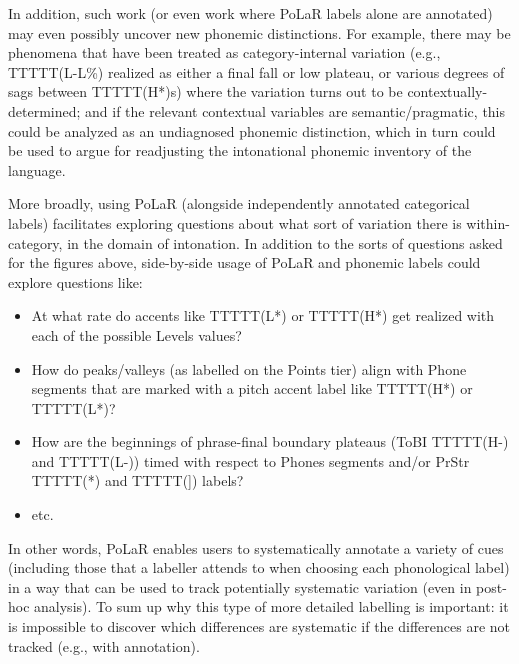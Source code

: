 \documentclass[11pt, twoside]{memoir}
\begin{document}
In addition, such work (or even work where PoLaR labels alone are annotated) may even possibly uncover new phonemic distinctions. For example, there may be phenomena that have been treated as category-internal variation (e.g., TTTTT(L-L\%) realized as either a final fall or low plateau, or various degrees of sags between TTTTT(H*)s) where the variation turns out to be contextually-determined; and if the relevant contextual variables are semantic\slash pragmatic, this could be analyzed as an undiagnosed phonemic distinction, which in turn could be used to argue for readjusting the intonational phonemic inventory of the language.

More broadly, using PoLaR (alongside independently annotated categorical labels) facilitates exploring questions about what sort of variation there is within-category, in the domain of intonation. In addition to the sorts of questions asked for the figures above, side-by-side usage of PoLaR and phonemic labels could explore questions like:

\begin{itemize}
	\item At what rate do accents like TTTTT(L*) or TTTTT(H*) get realized with each of the possible Levels values?
	\item How do peaks\slash valleys (as labelled on the Points tier) align with Phone segments that are marked with a pitch accent label like TTTTT(H*) or TTTTT(L*)?
	\item How are the beginnings of phrase-final boundary plateaus (ToBI TTTTT(H-) and TTTTT(L-)) timed with respect to Phones segments and/or PrStr TTTTT(*) and TTTTT(]) labels?
	\item etc.
\end{itemize}

In other words, PoLaR enables users to systematically annotate a variety of cues (including those that a labeller attends to when choosing each phonological label) in a way that can be used to track potentially systematic variation (even in post-hoc analysis). To sum up why this type of more detailed labelling is important: it is impossible to discover which differences are systematic if the differences are not tracked (e.g., with annotation).
\end{document}
